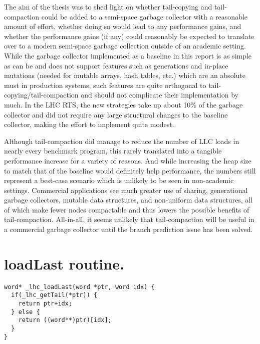 \documentclass[a4paper,oneside]{memoir}
\begin{document}
The aim of the thesis was to shed light on whether tail-copying and
tail-compaction could be added to a semi-space garbage collector with a
reasonable amount of effort, whether doing so would lead to any performance
gains, and whether the performance gains (if any) could reasonably be expected
to translate over to a modern semi-space garbage collection outside of an
academic setting. While the garbage collector implemented as a baseline in this
report is as simple as can be and does not support features such as generations
and in-place mutations (needed for mutable arrays, hash tables, etc.) which are
an absolute must in production systems, such features are quite orthogonal to
tail-copying/tail-compaction and should not complicate their implementation by
much. In the LHC RTS, the new strategies take up about 10\% of the garbage
collector and did not require any large structural changes to the baseline
collector, making the effort to implement quite modest.

Although tail-compaction did manage to reduce the number of LLC loads in nearly
every benchmark program, this rarely translated into a tangible performance
increase for a variety of reasons. And while increasing the heap size to match
that of the baseline would definitely help performance, the numbers still
represent a best-case scenario which is unlikely to be seen in non-academic
settings. Commercial applications see much greater use of sharing, generational
garbage collectors, mutable data structures, and non-uniform data structures, all
of which make fewer nodes compactable and thus lowers the possible benefits of
tail-compaction. All-in-all, it seems unlikely that tail-compaction will be
useful in a commercial garbage collector until the branch prediction issue has
been solved.







\appendix
\lstset{language=c}

\chapter{loadLast routine.}
\label{loadLast_code}

\begin{lstlisting}
word* _lhc_loadLast(word *ptr, word idx) {
  if(_lhc_getTail(*ptr)) {
    return ptr+idx;
  } else {
    return ((word**)ptr)[idx];
  }
}
\end{lstlisting}
\end{document}
